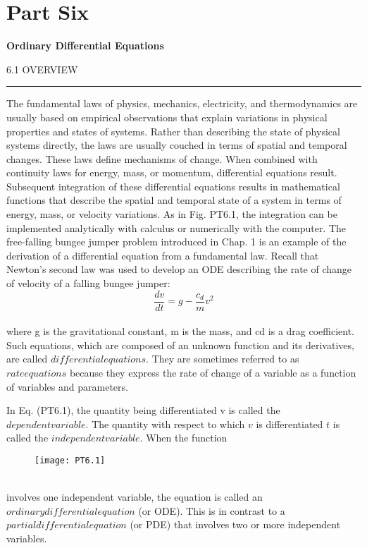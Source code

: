 \documentclass[../main.tex]{subfiles}
\begin{document}
\part{Part Six}



\begin{center}\begin{Large}\textbf{Ordinary Differential Equations}\end{Large}\end{center}



\Large{6.1 \; OVERVIEW}\\
\hrule
\vspace{0,5 cm}
The fundamental laws of physics, mechanics, electricity, and thermodynamics are usually
based on empirical observations that explain variations in physical properties and states of
systems. Rather than describing the state of physical systems directly, the laws are usually
couched in terms of spatial and temporal changes. These laws define mechanisms of
change. When combined with continuity laws for energy, mass, or momentum, differential
equations result. Subsequent integration of these differential equations results in mathematical functions that describe the spatial and temporal state of a system in terms of energy,
mass, or velocity variations. As in Fig. PT6.1, the integration can be implemented analytically with calculus or numerically with the computer. The free-falling bungee jumper problem introduced in Chap. 1 is an example of the derivation of a differential equation from a fundamental law. Recall that Newton's second law
was used to develop an ODE describing
the rate of change of velocity of a falling
bungee jumper:
\begin{equation}
\tag{PT6.1}
\dfrac{dv}{dt} = g - \dfrac{c_{d}}{m} v^{2}
\end{equation}\\
where g is the gravitational constant, m is
the mass, and cd is a drag coefficient.
Such equations, which are composed of
an unknown function and its derivatives,
are called $differential equations$. They
are sometimes referred to as $rate equations$ because they express the rate of
change of a variable as a function of variables and parameters.

In Eq. (PT6.1), the quantity being
differentiated v is called the $dependent
variable$. The quantity with respect to
which $v$ is differentiated $t$ is called the
$independent variable$. When the function
\pagebreak
\begin{figure}[hbt!]
	\texttt{[image: PT6.1]}
	\label{PT6.1}
\end{figure}\\
involves one independent variable, the equation is called an $ordinary differential equation$ (or ODE). This is in contrast to a $partial differential equation$ (or PDE) that involves two
or more independent variables.
\end{document}
